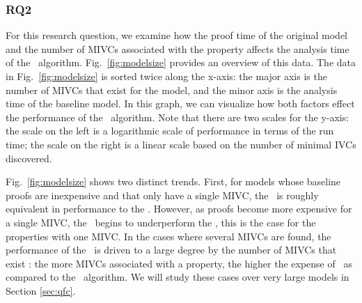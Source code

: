 \vspace{0.1in}
\subsubsection{RQ2} For this research question, we examine how the proof time of the original model and the number of MIVCs associated with the property affects the analysis time of the \aivcalg\ algorithm.  Fig.~\ref{fig:modelsize} provides an overview of this data.  The data in Fig.~\ref{fig:modelsize} is sorted twice along the x-axis: the major axis is the number of MIVCs that exist for the model, and the minor axis is the analysis time of the baseline model.  In this graph, we can visualize how both factors effect the performance of the \aivcalg\ algorithm.  Note that there are two scales for the y-axis: the scale on the left is a logarithmic scale of performance in terms of the run time; the scale on the right is a linear scale based on the number of minimal IVCs discovered.

Fig.~\ref{fig:modelsize} shows two distinct trends.  First, for models whose baseline proofs are inexpensive and that only have a single MIVC, the \aivcalg\ is roughly equivalent in performance to the \ucbfalg.  %
However, as proofs become more expensive for a single MIVC, the \aivcalg\ begins to underperform the \ucbfalg , this is the case for the properties with one MIVC.  In the cases where several MIVCs are found, the performance of the \aivcalg\ is driven to a large degree by the number of MIVCs that exist : the more MIVCs associated with a property, the higher the expense of \aivcalg\ as compared to the \ucbfalg\ algorithm. We will study these cases over very large models in Section \ref{sec:qfc}.


